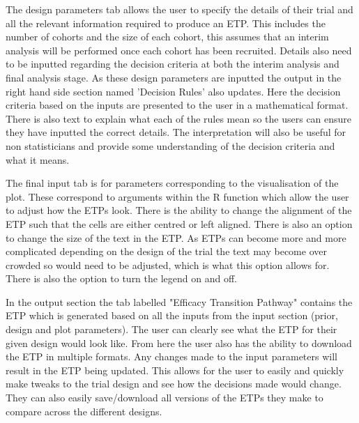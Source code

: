 The design parameters tab allows the user to specify the details of their trial and all the relevant information required to produce an ETP. This includes the number of cohorts and the size of each cohort, this assumes that an interim analysis will be performed once each cohort has been recruited. Details also need to be inputted regarding the decision criteria at both the interim analysis and final analysis stage. As these design parameters are inputted the output in the right hand side section named 'Decision Rules' also updates. Here the decision criteria based on the inputs are presented to the user in a mathematical format. There is also text to explain what each of the rules mean so the users can ensure they have inputted the correct details. The interpretation will also be useful for non statisticians and provide some understanding of the decision criteria and what it means.  

The final input tab is for parameters corresponding to the visualisation of the plot. These correspond to arguments within the R function which allow the user to adjust how the ETPs look. There is the ability to change the alignment of the ETP such that the cells are either centred or left aligned. There is also an option to change the size of the text in the ETP. As ETPs can become more and more complicated depending on the design of the trial the text may become over crowded so would need to be adjusted, which is what this option allows for. There is also the option to turn the legend on and off. 

In the output section the tab labelled "Efficacy Transition Pathway" contains the ETP which is generated based on all the inputs from the input section (prior, design and plot parameters). The user can clearly see what the ETP for their given design would look like. From here the user also has the ability to download the ETP in multiple formats. Any changes made to the input parameters will result in the ETP being updated. This allows for the user to easily and quickly make tweaks to the trial design and see how the decisions made would change. They can also easily save/download all versions of the ETPs they make to compare across the different designs. 

